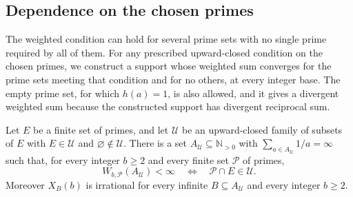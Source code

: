 \subsection{Dependence on the chosen primes}\label{sec:257-finite-witness-rules}
The weighted condition can hold for several prime sets with no single
prime required by all of them. For any prescribed upward-closed condition
on the chosen primes, we construct a support whose weighted sum converges
for the prime sets meeting that condition and for no others, at every
integer base. The empty prime set, for which $h(a)=1$, is also allowed,
and it gives a divergent weighted sum because the constructed support
has divergent reciprocal sum.

\begin{prop}
\label{prop:257-finite-witness-rule}
Let $E$ be a finite set of primes, and let $\mathcal U$ be an
upward-closed family of subsets of $E$ with $E\in\mathcal U$ and
$\varnothing\notin\mathcal U$.  There is a set
$A_{\mathcal U}\subseteq\mathbb N_{>0}$ with
$\sum_{a\in A_{\mathcal U}}1/a=\infty$ such that, for every integer
$b\ge2$ and every finite set $\mathcal P$ of primes,
\begin{equation}\label{eq:257-finite-witness-rule}
 W_{b,\mathcal P}(A_{\mathcal U})<\infty
 \quad\Longleftrightarrow\quad \mathcal P\cap E\in\mathcal U.
\end{equation}
Moreover $X_B(b)$ is irrational for every infinite
$B\subseteq A_{\mathcal U}$ and every integer $b\ge2$.
\end{prop}

